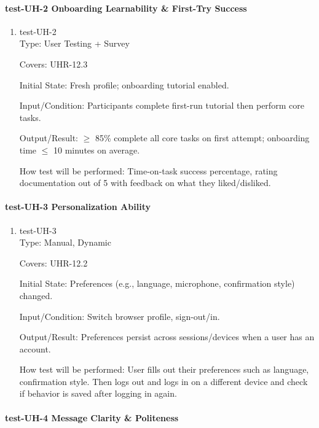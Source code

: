 \documentclass[12pt, titlepage]{article}
\begin{document}
\paragraph{test-UH-2 Onboarding Learnability \& First-Try Success}

\begin{enumerate}
\item{test-UH-2\\}
Type: User Testing + Survey

Covers: UHR-12.3

Initial State: Fresh profile; onboarding tutorial enabled.

Input/Condition: Participants complete first-run tutorial then perform core tasks.

Output/Result: $\geq$ 85\% complete all core tasks on first attempt; onboarding time $\leq$ 10 minutes on average.

How test will be performed: Time-on-task success percentage, rating documentation out of 5 with feedback on what they liked/disliked.
\end{enumerate}

\paragraph{test-UH-3 Personalization Ability}

\begin{enumerate}
\item{test-UH-3\\}
Type: Manual, Dynamic

Covers: UHR-12.2

Initial State: Preferences (e.g., language, microphone, confirmation style) changed.

Input/Condition: Switch browser profile, sign-out/in.

Output/Result: Preferences persist across sessions/devices when a user has an account.

How test will be performed: User fills out their preferences such as language, confirmation style. Then logs out and logs in on a different device and check if behavior is saved after logging in again.
\end{enumerate}

\paragraph{test-UH-4 Message Clarity \& Politeness}
\end{document}
